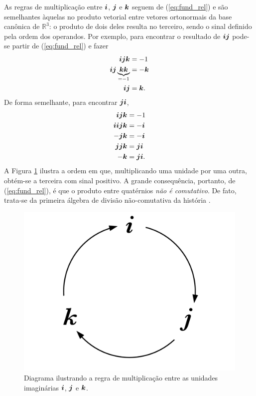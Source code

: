 As regras de multiplica\c c\~ao entre $ \boldsymbol{i} $, $ \boldsymbol{j} $ e $ \boldsymbol{k} $ seguem de (\ref{eq:fund_rel}) e s\~ao semelhantes \`aquelas no produto vetorial entre vetores ortonormais da base can\^onica de $ \mathbb{R}^3 $: o produto de dois deles resulta no terceiro, sendo o sinal definido pela ordem dos operandos. Por exemplo, para encontrar o resultado de $ \boldsymbol{i} \boldsymbol{j} $ pode-se partir de (\ref{eq:fund_rel}) e fazer
\begin{equation}
\begin{aligned}
\boldsymbol{i} \boldsymbol{j} \boldsymbol{k} &= -1 \\
\boldsymbol{i} \boldsymbol{j} \underbrace{\boldsymbol{k} \boldsymbol{k}}_{= -1} &= -\boldsymbol{k} \\
\boldsymbol{i} \boldsymbol{j} &= \boldsymbol{k}.
\end{aligned}
\end{equation}
De forma semelhante, para encontrar $ \boldsymbol{j} \boldsymbol{i} $,
\begin{equation}
\begin{aligned}
\boldsymbol{i} \boldsymbol{j} \boldsymbol{k} &= -1 \\
\boldsymbol{i} \boldsymbol{i} \boldsymbol{j} \boldsymbol{k} &= -\boldsymbol{i} \\
- \boldsymbol{j} \boldsymbol{k} &= - \boldsymbol{i} \\
\boldsymbol{j} \boldsymbol{j} \boldsymbol{k} &=  \boldsymbol{j} \boldsymbol{i} \\
- \boldsymbol{k} &=  \boldsymbol{j} \boldsymbol{i}. \\
\end{aligned}
\end{equation}
A Figura \ref{fig:quatmult} ilustra a ordem em que, multiplicando uma unidade por uma outra, obt\'em-se a terceira com sinal positivo. A grande consequ\^encia, portanto, de (\ref{eq:fund_rel}), \'e que o produto entre quat\'ernios \emph{n\~ao \'e comutativo}. De fato, trata-se da primeira \'algebra de divis\~ao n\~ao-comutativa da hist\'oria \cite{kleiner2007history}.

\begin{figure}
	\centering
	\includegraphics[width=0.2\linewidth]{Figures/quaternion_multiplication.pdf}
	\caption{Diagrama ilustrando a regra de multiplica\c c\~ao entre as unidades imagin\'arias $ \boldsymbol{i} $, $ \boldsymbol{j} $ e $ \boldsymbol{k} $.}
	\label{fig:quatmult}
\end{figure}


